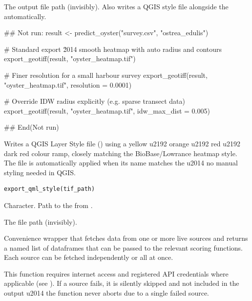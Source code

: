 \documentclass[a4paper]{book}
\begin{document}
%
\begin{Value}
The output file path (invisibly). Also writes a  QGIS style
file alongside the  automatically.
\end{Value}
%
\begin{Examples}
\begin{ExampleCode}
## Not run: 
result <- predict_oyster("survey.csv", "ostrea_edulis")

# Standard export \u2014 smooth heatmap with auto radius and contours
export_geotiff(result, "oyster_heatmap.tif")

# Finer resolution for a small harbour survey
export_geotiff(result, "oyster_heatmap.tif", resolution = 0.0001)

# Override IDW radius explicitly (e.g. sparse transect data)
export_geotiff(result, "oyster_heatmap.tif", idw_max_dist = 0.005)

## End(Not run)
\end{ExampleCode}
\end{Examples}
%
\begin{Description}
Writes a QGIS Layer Style file () using a yellow \bsl{}u2192 orange \bsl{}u2192 red \bsl{}u2192
dark red colour ramp, closely matching the BioBase/Lowrance heatmap style.
The file is automatically applied when its name matches the  \bsl{}u2014 no
manual styling needed in QGIS.
\end{Description}
%
\begin{Usage}
\begin{verbatim}
export_qml_style(tif_path)
\end{verbatim}
\end{Usage}
%
\begin{Arguments}
\begin{ldescription}
\item[\code{tif\_path}] Character. Path to the  from .
\end{ldescription}
\end{Arguments}
%
\begin{Value}
The  file path (invisibly).
\end{Value}
%
\begin{Description}
Convenience wrapper that fetches data from one or more live sources and
returns a named list of dataframes that can be passed to the relevant
scoring functions. Each source can be fetched independently or all at once.

This function requires internet access and registered API credentials where
applicable (see ). If a source fails, it is
silently skipped and not included in the output \bsl{}u2014 the function never aborts
due to a single failed source.
\end{Description}
\end{document}
